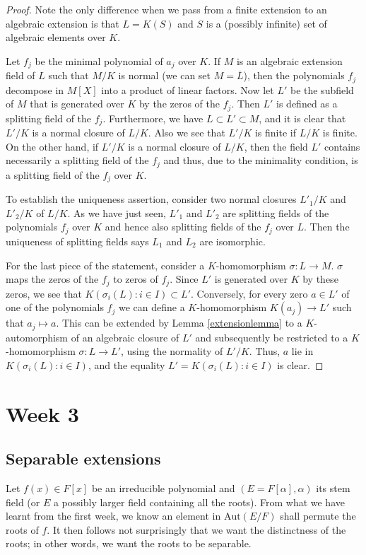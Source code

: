 \documentclass[12pt]{report}
\theoremstyle{definition}
\newcommand{\Aut}{\text{Aut}}
\begin{document}
\begin{proof}
	Note the only difference when we pass from a finite extension to an algebraic extension is that $L=K(S)$ and $S$ is a (possibly infinite) set of algebraic elements over $K$.

	Let $f_j$ be the minimal polynomial of $a_j$ over $K$. If $M$ is an algebraic extension field of $L$ such that $M/K$ is normal (we can set $M=\overline{L}$), then the polynomials $f_j$ decompose in $M[X]$ into a product of linear factors. Now let $L'$ be the subfield of $M$ that is generated over $K$ by the zeros of the $f_j$. Then $L'$ is defined as a splitting field of the $f_j$. Furthermore, we have $L \subset L' \subset M$, and it is clear that $L'/K$ is a normal closure of $L/K$. Also we see that $L'/K$ is finite if $L/K$ is finite. On the other hand, if $L'/K$ is a normal closure of $L/K$, then the field $L'$ contains necessarily a splitting field of the $f_j$ and thus, due to the minimality condition, is a splitting field of the $f_j$ over $K$.


	To establish the uniqueness assertion, consider two normal closures $L'_1/K$ and $L'_2/K$ of $L/K$. As we have just seen, $L'_1$ and $L'_2$ are splitting fields of the polynomials $f_j$ over $K$ and hence also splitting fields of the $f_j$ over $L$. Then the uniqueness of splitting fields says $L_1$ and $L_2$ are isomorphic.


	For the last piece of the statement, consider a $K$-homomorphism $\sigma : L \to M$. $\sigma$ maps the zeros of the $f_j$ to zeros of $f_j$. Since $L'$ is generated over $K$ by these zeros, we see that $K(\sigma_i(L): i \in I) \subset L'$. Conversely, for every zero $a \in L'$ of one of the polynomials $f_j$ we can define a $K$-homomorphism $K(a_j) \to L'$ such that $a_j \mapsto a$. This can be extended by Lemma \ref{extensionlemma} to a $K$-automorphism of an algebraic closure of $L'$ and subsequently be restricted to a $K$-homomorphism $\sigma : L \to L'$, using the normality of $L'/K$. Thus, $a$ lie in $K(\sigma_i(L): i \in I)$, and the equality $L' = K(\sigma_i(L): i \in I)$ is clear.
\end{proof}

\chapter*{Week 3}
\setcounter{chapter}{3}

\section{Separable extensions}
Let $f(x)\in F[x]$ be an irreducible polynomial and $(E=F[\alpha],\alpha)$ its stem field (or $E$ a possibly larger field containing all the roots). From what we have learnt from the first week, we know an element in $\Aut(E/F)$ shall permute the roots of $f$. It then follows not surprisingly that we want the distinctness of the roots; in other words, we want the roots to be separable.
\end{document}

